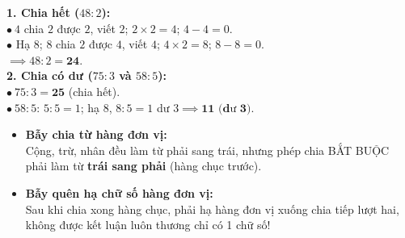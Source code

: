 \documentclass[12pt,a4paper]{article}
\begin{document}
\vspace{-2.5mm}
\noindent
\begin{minipage}[t]{0.49\textwidth}\vspace{0pt}
\begin{tcolorbox}[
  enhanced,
  colback=green!4!white,
  colframe=green!60!black,
  arc=2mm, boxrule=0.8pt,
  left=2mm, right=2mm, top=1.8mm, bottom=1.8mm,
  title={\footnotesize\bfseries\color{white}\faCheckCircle\ Ví dụ thực hành chuẩn mực}
]
{\footnotesize
\textbf{1. Chia hết ($48 : 2$):}\\
$\bullet\ 4$ chia $2$ được $2$, viết $2$; $2 \times 2 = 4$; $4 - 4 = 0$.\\
$\bullet$ Hạ $8$; $8$ chia $2$ được $4$, viết $4$; $4 \times 2 = 8$; $8 - 8 = 0$.\\
$\implies 48 : 2 = \mathbf{24}$.\\[1mm]
\textbf{2. Chia có dư ($75 : 3$ và $58 : 5$):}\\
$\bullet\ 75 : 3 = \mathbf{25}$ (chia hết).\\
$\bullet\ 58 : 5$: $5 : 5 = 1$; hạ $8$, $8 : 5 = 1$ dư $3 \implies \mathbf{11\text{ (dư 3)}}$.
}
\end{tcolorbox}
\end{minipage}
\hfill
\begin{minipage}[t]{0.49\textwidth}\vspace{0pt}
\begin{tcolorbox}[
  enhanced,
  colback=red!4!white,
  colframe=red!70!black,
  arc=2mm, boxrule=0.8pt,
  left=2mm, right=2mm, top=1.8mm, bottom=1.8mm,
  title={\footnotesize\bfseries\color{white}\faExclamationTriangle\ Mẹo tránh bẫy trắc nghiệm}
]
{\footnotesize
\begin{itemize}\setlength{\itemsep}{1.5pt}\setlength{\leftskip}{-2.5mm}
  \item \textbf{Bẫy chia từ hàng đơn vị:}\\
  Cộng, trừ, nhân đều làm từ phải sang trái, nhưng phép chia BẮT BUỘC phải làm từ \textbf{trái sang phải} (hàng chục trước).
  \item \textbf{Bẫy quên hạ chữ số hàng đơn vị:}\\
  Sau khi chia xong hàng chục, phải hạ hàng đơn vị xuống chia tiếp lượt hai, không được kết luận luôn thương chỉ có 1 chữ số!
\end{itemize}
}
\end{tcolorbox}
\end{minipage}
\end{document}
